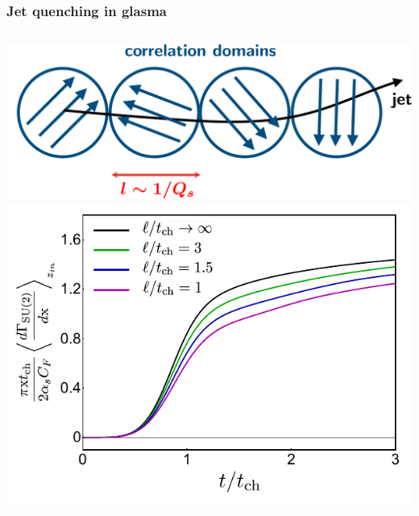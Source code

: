 \documentclass[aspectratio=169,11pt,usenames,dvipsnames]{beamer}
\begin{document}
\begin{frame}[noframenumbering]
    \frametitle{Jet quenching in glasma}
    \vspace{-15pt}
    \begin{center}
        \begin{columns}[onlytextwidth,t]
            \vspace{5pt}
            \begin{center}
                \includegraphics[width=0.88\columnwidth]{images/glasma_corr_dom_jet.pdf}
                \\[5pt]
                \includegraphics[width=0.95\columnwidth]{images/jeteloss.pdf}
            \end{center}


\end{columns}
\end{center}
\end{frame}
\end{document}
